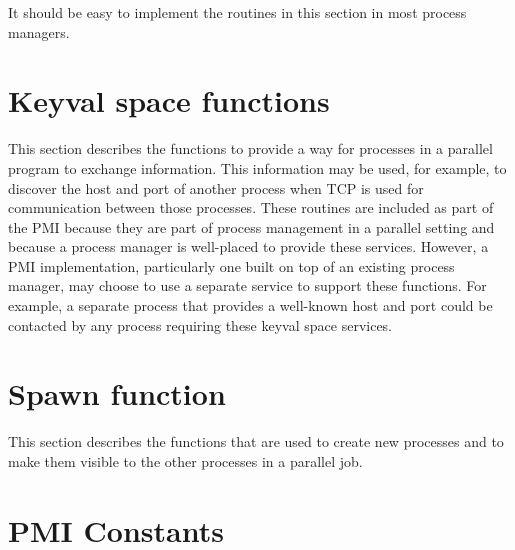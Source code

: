 \documentclass{article}
\begin{document}
It should be easy to implement the routines in this section in most process
managers. 













%

\section{Keyval space functions}
This section describes the functions to provide a way for processes in a
parallel program to exchange information.  This information may be used, for
example, to discover the host and port of another process when TCP is used for
communication between those processes.  These routines are included as part of
the PMI because they are part of process management in a parallel setting and
because a process manager is well-placed to provide these services.  However,
a PMI implementation, particularly one built on top of an existing process
manager, may choose to use a separate service to support these functions.
For example, a separate process that provides a well-known host and port could
be contacted by any process requiring these keyval space services.













\section{Spawn function}
This section describes the functions that are used to create new processes and
to make them visible to the other processes in a parallel job.  









\section{PMI Constants}


\let\SaveIndex=\theindex
\long\def\theindex#1{\SaveIndex{#1}\addcontentsline{toc}{section}{Index}}

\end{document}
